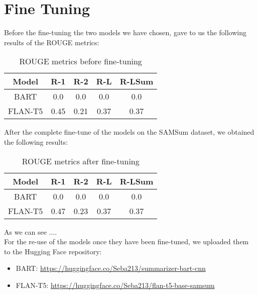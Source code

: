 \documentclass[10pt,twocolumn,letterpaper]{article}
\begin{document}
\section{Fine Tuning}
Before the fine-tuning the two models we have chosen, gave to us the following results of the ROUGE metrics:
\begin{table}[h!]
    \centering
    \begin{tabular}{|c|c|c|c|c|}
        \hline
        \rowcolor{lightergray}
        Model & R-1 & R-2 & R-L & R-LSum \\ 
        \hline
        BART & 0.0 & 0.0 & 0.0 & 0.0\\
        FLAN-T5 & 0.45 & 0.21 & 0.37 & 0.37\\
        \hline
    \end{tabular}
    \caption{ROUGE metrics before fine-tuning}
    \label{table:ROUGEbeforeft}
\end{table}

After the complete fine-tune of the models on the SAMSum dataset, we obtained the following results:
\begin{table}[h!]
    \centering
    \begin{tabular}{|c|c|c|c|c|}
        \hline
        \rowcolor{lightergray}
        Model & R-1 & R-2 & R-L & R-LSum \\ 
        \hline
        BART & 0.0 & 0.0 & 0.0 & 0.0\\
        FLAN-T5 & 0.47 & 0.23 & 0.37 & 0.37 \\
        \hline
    \end{tabular}
    \caption{ROUGE metrics after fine-tuning}
    \label{table:ROUGEafterft}
\end{table}

As we can see .... \\
For the re-use of the models once they have been fine-tuned, we uploaded them to the Hugging Face repository:
\begin{itemize}
    \item BART: \url{https://huggingface.co/Seba213/summarizer-bart-cnn}
    \item FLAN-T5: \url{https://huggingface.co/Seba213/flan-t5-base-samsum}
\end{itemize}
\end{document}
